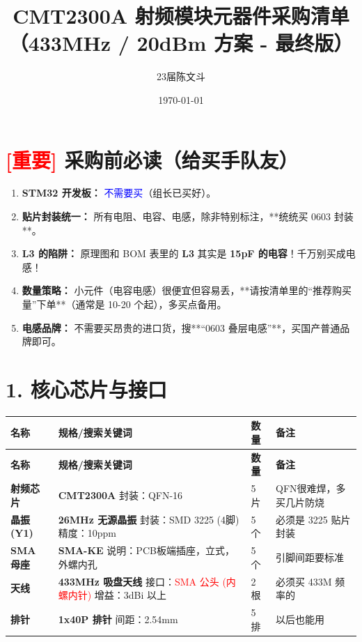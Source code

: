 \documentclass[a4paper,12pt]{article}
\title{\textbf{CMT2300A 射频模块元器件采购清单}\\ \large （433MHz / 20dBm 方案 - 最终版）}
\author{23届陈文斗}
\date{\today}
\begin{document}
	\maketitle

	\section*{\textcolor{red}{[重要]} 采购前必读（给买手队友）}
	\begin{enumerate}
		\item \textbf{STM32 开发板：} \textcolor{blue}{不需要买}（组长已买好）。
		\item \textbf{贴片封装统一：} 所有电阻、电容、电感，除非特别标注，**统统买 0603 封装**。
		\item \textbf{L3 的陷阱：} 原理图和 BOM 表里的 \textbf{L3} 其实是 \textbf{15pF 的电容}！千万别买成电感！
		\item \textbf{数量策略：} 小元件（电容电感）很便宜但容易丢，**请按清单里的“推荐购买量”下单**（通常是 10-20 个起），多买点备用。
		\item \textbf{电感品牌：} 不需要买昂贵的进口货，搜**“0603 叠层电感”**，买国产普通品牌即可。
	\end{enumerate}

	\section{1. 核心芯片与接口}
	\begin{longtable}{|p{3cm}|p{6cm}|p{2cm}|p{3.5cm}|}
		\hline
		\textbf{名称} & \textbf{规格/搜索关键词} & \textbf{数量} & \textbf{备注} \\ \hline
		\endfirsthead
		\hline
		\textbf{名称} & \textbf{规格/搜索关键词} & \textbf{数量} & \textbf{备注} \\ \hline
		\endhead

		\textbf{射频芯片} & \textbf{CMT2300A} \newline 封装：QFN-16 & 5 片 & QFN很难焊，多买几片防烧 \\ \hline
		\textbf{晶振 (Y1)} & \textbf{26MHz 无源晶振} \newline 封装：SMD 3225 (4脚) \newline 精度：10ppm & 5 个 & 必须是 3225 贴片封装 \\ \hline
		\textbf{SMA 母座} & \textbf{SMA-KE} \newline 说明：PCB板端插座，立式，外螺内孔 & 5 个 & 引脚间距要标准 \\ \hline
		\textbf{天线} & \textbf{433MHz 吸盘天线} \newline 接口：\textcolor{red}{SMA 公头 (内螺内针)} \newline 增益：3dBi 以上 & 2 根 & 必须买 433M 频率的 \\ \hline
		\textbf{排针} & \textbf{1x40P 排针} \newline 间距：2.54mm & 5 排 & 以后也能用 \\ \hline
	\end{longtable}
\end{document}
